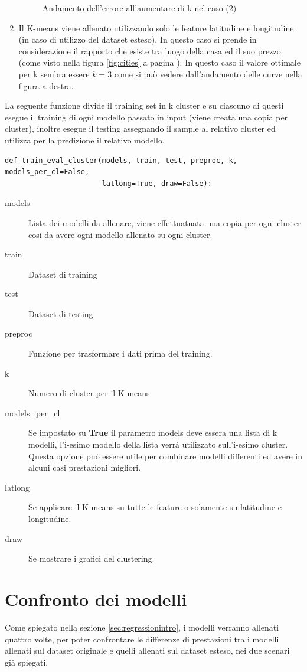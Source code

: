 \documentclass{article}
\begin{document}
\begin{enumerate}
\begin{figure}[ht]
\begin{minipage}{0.48\textwidth}
				\caption{Andamento dell'errore all'aumentare di k nel caso (2)}
			\end{minipage}
		\end{figure}
	\item Il K-means viene allenato utilizzando solo le feature latitudine
		e longitudine (in caso di utilizzo del dataset esteso). In questo caso
		si prende in considerazione il rapporto che esiste tra luogo della casa
		ed il suo prezzo (come visto nella figura \ref{fig:cities} a pagina
		\pageref{fig:cities}). In questo caso il valore ottimale per k sembra
		essere $k=3$ come si può vedere dall'andamento delle curve nella
		figura a destra.
\end{enumerate}

La seguente funzione divide il training set in k cluster e su ciascuno di
questi esegue il training di ogni modello passato in input (viene creata una
copia per cluster), inoltre esegue il testing assegnando il sample al relativo
cluster ed utilizza per la predizione il relativo modello.
\begin{verbatim}
def train_eval_cluster(models, train, test, preproc, k, models_per_cl=False, 
                       latlong=True, draw=False):
\end{verbatim}
\begin{description}
	\item[models] Lista dei modelli da allenare, viene effettuatuata una copia
		per ogni cluster cosi da avere ogni modello allenato su ogni cluster.
	\item[train] Dataset di training
	\item[test] Dataset di testing
	\item[preproc] Funzione per trasformare i dati prima del training.
	\item[k] Numero di cluster per il K-means
	\item[models\_per\_cl] Se impostato su \textbf{True} il parametro models
		deve essera una lista di k modelli, l'i-esimo modello della lista verrà
		utilizzato sull'i-esimo cluster. Questa opzione può essere utile per
		combinare modelli differenti ed avere in alcuni casi prestazioni
		migliori.
	\item[latlong] Se applicare il K-means su tutte le feature o solamente su
		latitudine e longitudine.
	\item[draw] Se mostrare i grafici del clustering.
\end{description}
\newpage

\section{Confronto dei modelli}
Come spiegato nella sezione \ref{sec:regressionintro}, i modelli verranno
allenati quattro volte, per poter confrontare le differenze di prestazioni tra
i modelli allenati sul dataset originale e quelli allenati sul dataset esteso,
nei due scenari già spiegati.
\end{document}
